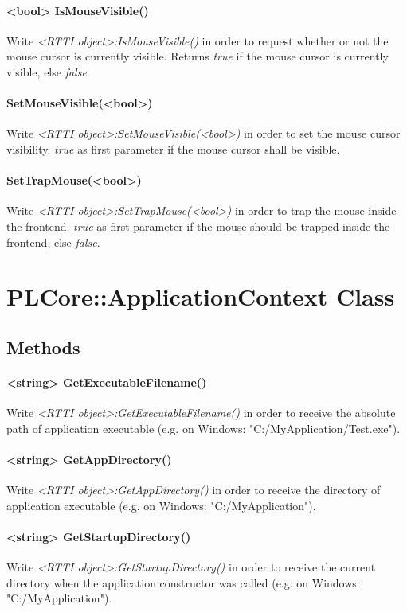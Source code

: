 \paragraph{<bool> IsMouseVisible()}
Write \emph{<RTTI object>:IsMouseVisible()} in order to request whether or not the mouse cursor is currently visible. Returns \emph{true} if the mouse cursor is currently visible, else \emph{false}.

\paragraph{SetMouseVisible(<bool>)}
Write \emph{<RTTI object>:SetMouseVisible(<bool>)} in order to set the mouse cursor visibility. \emph{true} as first parameter if the mouse cursor shall be visible.

\paragraph{SetTrapMouse(<bool>)}
Write \emph{<RTTI object>:SetTrapMouse(<bool>)} in order to trap the mouse inside the frontend. \emph{true} as first parameter if the mouse should be trapped inside the frontend, else \emph{false}.




\section{PLCore::ApplicationContext Class}


\subsection{Methods}

\paragraph{<string> GetExecutableFilename()}
Write \emph{<RTTI object>:GetExecutableFilename()} in order to receive the absolute path of application executable (e.g. on Windows: "C:/MyApplication/Test.exe").

\paragraph{<string> GetAppDirectory()}
Write \emph{<RTTI object>:GetAppDirectory()} in order to receive the directory of application executable (e.g. on Windows: "C:/MyApplication").

\paragraph{<string> GetStartupDirectory()}
Write \emph{<RTTI object>:GetStartupDirectory()} in order to receive the current directory when the application constructor was called (e.g. on Windows: "C:/MyApplication").

